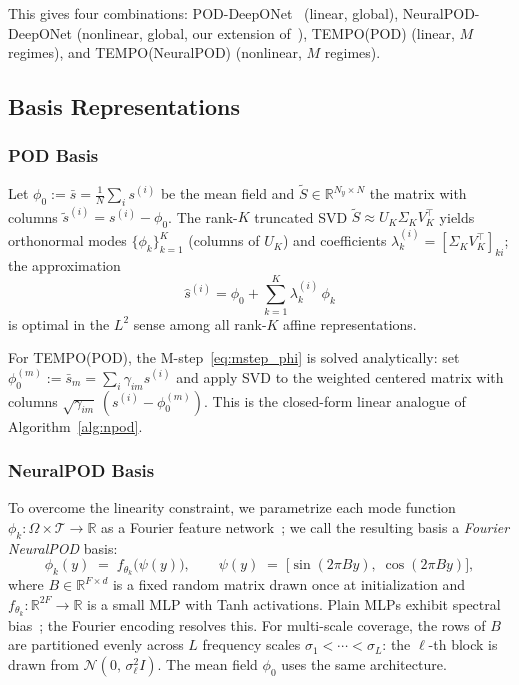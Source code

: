 \documentclass{article}
\begin{document}
\noindent
This gives four combinations:
POD-DeepONet~\cite{Lu2022} (linear, global),
NeuralPOD-DeepONet (nonlinear, global, our extension of~\cite{Mou2026}),
TEMPO(POD) (linear, $M$ regimes), and
TEMPO(NeuralPOD) (nonlinear, $M$ regimes).


\subsection{Basis Representations}\label{sec:bases}


\subsubsection{POD Basis}

Let $\phi_0 := \bar{s} = \tfrac{1}{N}\sum_i s^{(i)}$ be the mean field
and $\tilde{S} \in \mathbb{R}^{N_y \times N}$ the matrix with columns
$\tilde{s}^{(i)} = s^{(i)} - \phi_0$.
The rank-$K$ truncated SVD $\tilde{S} \approx U_K \Sigma_K V_K^\top$
yields orthonormal modes $\{\phi_k\}_{k=1}^K$ (columns of $U_K$) and
coefficients $\lambda_k^{(i)} = [\Sigma_K V_K^\top]_{ki}$; the
approximation
\begin{equation}
  \hat{s}^{(i)} = \phi_0 + \sum_{k=1}^{K} \lambda_k^{(i)}\,\phi_k
  \label{eq:pod_approx}
\end{equation}
is optimal in the $L^2$ sense among all rank-$K$ affine representations.

For TEMPO(POD), the M-step~\eqref{eq:mstep_phi} is solved analytically:
set $\phi_0^{(m)} := \bar{s}_m = \sum_i \gamma_{im} s^{(i)}$ and apply SVD to
the weighted centered matrix with columns
$\sqrt{\gamma_{im}}\,(s^{(i)}-\phi_0^{(m)})$.
This is the closed-form linear analogue of Algorithm~\ref{alg:npod}.

\subsubsection{NeuralPOD Basis}\label{sec:neuralpod_basis}

To overcome the linearity constraint, we parametrize each mode
function $\phi_k : \Omega{\times}\mathcal{T} \to \mathbb{R}$ as a
Fourier feature network~\cite{Tancik2020}; we call the resulting basis a \emph{Fourier NeuralPOD} basis:
\begin{equation}
  \phi_k(y) \;=\; f_{\theta_k}\!\bigl(\psi(y)\bigr),
  \qquad
  \psi(y) \;=\;
  \bigl[\sin(2\pi By),\;\cos(2\pi By)\bigr],
  \label{eq:ffn}
\end{equation}
where $B \in \mathbb{R}^{F \times d}$ is a fixed random matrix drawn
once at initialization and $f_{\theta_k} : \mathbb{R}^{2F} \to \mathbb{R}$
is a small MLP with Tanh activations.
Plain MLPs exhibit spectral bias~\cite{Rahaman2019}; the Fourier encoding
resolves this.
For multi-scale coverage, the rows of $B$ are partitioned evenly across
$L$ frequency scales $\sigma_1 < \cdots < \sigma_L$: the $\ell$-th block is drawn from
$\mathcal{N}(0,\,\sigma_\ell^2 I)$.
The mean field $\phi_0$ uses the same architecture.
\end{document}
